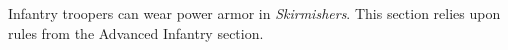 Infantry troopers can wear power armor in \emph{Skirmishers}.
This section relies upon rules from the Advanced Infantry section.
